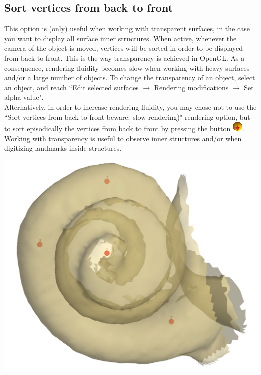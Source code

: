 \noindent
\begin{minipage}{0.55\textwidth}
\subsection{Sort vertices from back to front}
This option is (only) useful when working with transparent surfaces, in the case you want to display all surface inner structures. When active, whenever the camera of the
object is moved, vertices will be sorted in order to be displayed from back to front. This is the way transparency is achieved in OpenGL. As a consequence, rendering fluidity
becomes slow when working with heavy surfaces and/or a large number of objects. To change the transparency of an object, select an object, and reach ``Edit selected surfaces $\rightarrow$
Rendering modifications $\rightarrow$ Set alpha value".\\

Alternatively, in order to increase rendering fluidity, you may chose not to use the ``Sort vertices from back to front beware: slow rendering)" rendering option, but to sort episodically the vertices from back to front by pressing the button \includegraphics[scale=0.7]{images/pixmap/Sort_vertices01.png}.\\
Working with transparency is useful to observe inner structures and/or when digitizing landmarks
inside structures.

\end{minipage}  
 \begin{minipage}{0.45\textwidth}\centering

\includegraphics[scale=0.1]{images/Viewing_options/Sort_back_front.png}

 \end{minipage} 
\noindent


